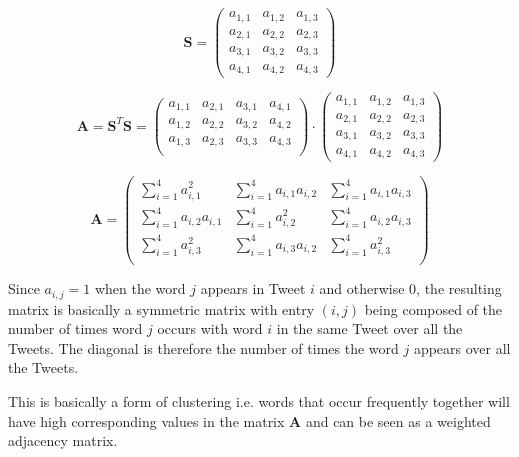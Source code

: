 \documentclass[11pt,a4paper]{article}
\newcommand{\smat}{\mathbf{S}}
\newcommand{\covmat}{\mathbf{A}}
\begin{document}
\begin{equation}
\smat = \left( \begin{matrix}
a_{1, 1} & a_{1, 2} & a_{1, 3} \\ 
a_{2, 1} & a_{2, 2} & a_{2, 3} \\
a_{3, 1} & a_{3, 2} & a_{3, 3} \\
a_{4, 1} & a_{4, 2} & a_{4, 3} 
\end{matrix} \right)
\end{equation}

\begin{equation}
\covmat = \smat^T\smat =
 \left( \begin{matrix}
a_{1, 1} & a_{2, 1} & a_{3, 1} & a_{4, 1} \\ 
a_{1, 2} & a_{2, 2} & a_{3, 2} & a_{4, 2} \\ 
a_{1, 3} & a_{2, 3} & a_{3, 3} & a_{4, 3} \\ 

\end{matrix} \right)
\cdot \left( \begin{matrix}
a_{1, 1} & a_{1, 2} & a_{1, 3} \\ 
a_{2, 1} & a_{2, 2} & a_{2, 3} \\
a_{3, 1} & a_{3, 2} & a_{3, 3} \\
a_{4, 1} & a_{4, 2} & a_{4, 3} 
\end{matrix} \right)
\end{equation}


\begin{equation}
\covmat =
\left( \begin{matrix}
\sum_{i=1}^4 a_{i,1}^2& \sum_{i=1}^4 a_{i,1} a_{i,2} &  \sum_{i=1}^4 a_{i,1} a_{i,3} \\ 
\sum_{i=1}^4 a_{i,2}a_{i, 1} & \sum_{i=1}^4 a_{i,2}^2 &  \sum_{i=1}^4 a_{i,2} a_{i,3} \\ 
\sum_{i=1}^4 a_{i,3}^2& \sum_{i=1}^4 a_{i,3} a_{i,2} &  \sum_{i=1}^4  a_{i,3}^2 \\ 
\end{matrix} \right)
\end{equation}

Since $a_{i, j} = 1$ when the word $j$ appears in Tweet $i$ and otherwise 0, the resulting matrix is basically a symmetric matrix with entry $(i, j)$ being composed of the number of times word $j$ occurs with word $i$ in the same Tweet over all the Tweets. The diagonal is  therefore the number of times the word $j$ appears over all the Tweets.

This is basically a form of clustering i.e. words that occur frequently together will have high corresponding values in the matrix $\covmat$ and can be seen as a weighted adjacency matrix.
\end{document}

